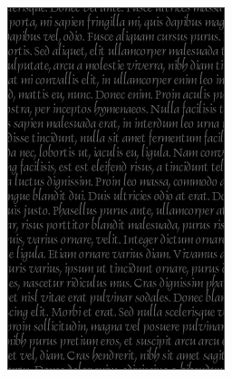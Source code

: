 \begin{figure}[t]
  \centering
  \begin{minipage}{.49\linewidth}
    \includegraphics[width=\linewidth]{figs/vertical-rectangle-black}
  \end{minipage}
  \hfill
  \begin{minipage}{.49\linewidth}

\end{minipage}
\end{figure}
